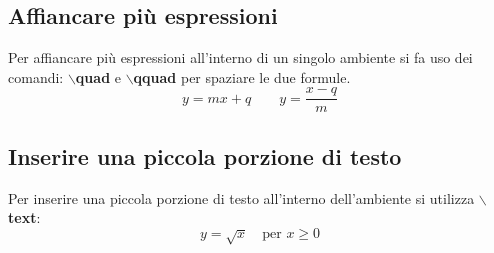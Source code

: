 \documentclass[a4paper,12pt,oneside]{book}
\theoremstyle{plain}
\begin{document}
	\subsection{Affiancare più espressioni}
	Per affiancare più espressioni all'interno di un singolo ambiente si fa uso dei comandi: \textbf{$\backslash$quad} e \textbf{$\backslash$qquad} per spaziare le due formule.
	\[
	y = mx + q\qquad y = \frac{x - q}{m}
	\]
	
	\subsection{Inserire una piccola porzione di testo}
	Per inserire una piccola porzione di testo all'interno dell'ambiente si utilizza \textbf{$\backslash$text}:
	\[
	y = \sqrt{x} \quad\textrm{per $x\geq 0$}
	\]
	
	
\end{document}
